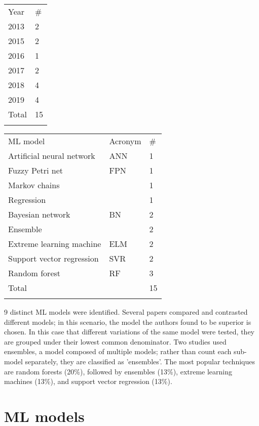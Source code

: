 \documentclass{article}
\begin{document}
\begin{table}[ht]
\centering
\begin{tabular}{ll}
\noalign{\smallskip}\hline \noalign{\smallskip}
Year & \# \\	\noalign{\smallskip}\hline \noalign{\smallskip}
2013 & 2 \\
2015 & 2 \\
2016 & 1 \\
2017 & 2 \\
2018 & 4 \\
2019 & 4 \\ \noalign{\smallskip}
Total & 15 \\ \noalign{\smallskip}\hline
\end{tabular}

\begin{tabular}{lll}
\noalign{\smallskip}\hline \noalign{\smallskip}
ML model & Acronym & \# \\ \noalign{\smallskip}\hline \noalign{\smallskip}
Artificial neural network & ANN & 1 \\
Fuzzy Petri net & FPN & 1 \\
Markov chains &  & 1 \\
Regression &  & 1 \\
Bayesian network & BN & 2 \\
Ensemble &  & 2 \\
Extreme learning machine & ELM & 2 \\
Support vector regression & SVR & 2 \\
Random forest & RF & 3 \\ \noalign{\smallskip}\hline \noalign{\smallskip}
Total &  & 15 \\ \noalign{\smallskip} \hline
\end{tabular}
\end{table}

9 distinct ML models were identified. Several papers compared and contrasted different models; in this scenario, the model the authors found to be superior is chosen. In this case that different variations of the same model were tested, they are grouped under their lowest common denominator. Two studies \cite{nair_et_al_2019}\cite{oneto_et_al_2019} used ensembles, a model composed of multiple models; rather than count each sub-model separately, they are classified as 'ensembles'. The most popular techniques are random forests (20\%), followed by ensembles (13\%), extreme learning machines (13\%), and support vector regression (13\%).

\section{ML models}
\end{document}
